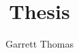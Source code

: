 \documentclass[12pt,a4paper]{report}
\title{Thesis}
\author{Garrett Thomas}
\begin{document}
\maketitle
\tableofcontents
\newpage
\listoffigures
\newpage
\FloatBarrier

\newpage
\FloatBarrier

\newpage
\FloatBarrier

%
%
\newpage
\FloatBarrier

\newpage
\FloatBarrier

\newpage
\FloatBarrier

%

\newpage
\FloatBarrier


\end{document}
